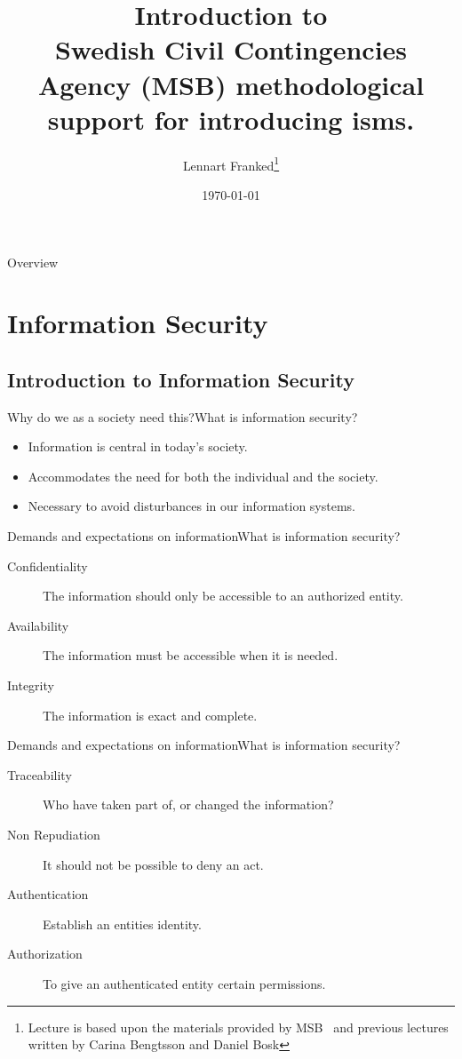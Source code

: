 \documentclass{beamer}
\title[Intro infosäk]{%
  Introduction to\\
  Swedish Civil Contingencies Agency (MSB) methodological support for introducing \ac{isms}.
}
\author{Lennart Franked\footnote{Lecture is based upon the materials provided by
  MSB~\cite{msb_metodstod} and previous lectures written by Carina Bengtsson and
  Daniel Bosk}}
\institute[MIUN IST]{%
  Department of Informationsystem and Technologies (IST),\\
  Mid Sweden University, Sundsvall.
}
\date{\today}
\begin{document}
\begin{frame}
  \titlepage{}
\end{frame}

\begin{frame}{Overview}
	\tableofcontents
\end{frame}

\section[Information Security]{Information Security}
\subsection{Introduction to Information Security}

\begin{frame}{Why do we as a society need this?}{What is information security?}
  \begin{itemize}
    \item Information is central in today's society.
    \item Accommodates the need for both the individual and the society.
    \item Necessary to avoid disturbances in our information systems.
  \end{itemize}
\end{frame}

\begin{frame}{Demands and expectations on information}{What is information security?}
  \begin{description}
    \item[Confidentiality] The information should only be accessible to an
      authorized entity.

    \item[Availability] The information must be accessible when it is needed.

    \item[Integrity] The information is exact and complete.

  \end{description}
\end{frame}

\begin{frame}{Demands and expectations on information}{What is information security?}
  \begin{description}
    \item[Traceability] Who have taken part of, or changed the information?
    \item[Non Repudiation] It should not be possible to deny an act.
    \item[Authentication] Establish an entities identity.
    \item[Authorization] To give an authenticated entity certain permissions.
  \end{description}
\end{frame}
\end{document}
